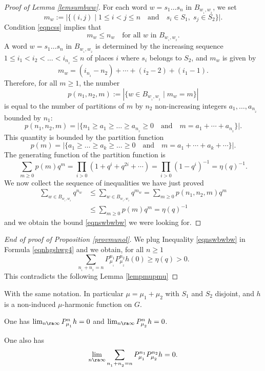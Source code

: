 \begin{proof}[Proof of Lemma \ref{lemsumbww}]
For each word $w=s_1\ldots s_n$ in $B_{w_{_1}\!,w_{_2}}$, we set
\[
m_w:=\bigl|\{(i,j)\mid 1\leq i< j\leq n
\quad\text{and}\quad s_i\in S_1,\; s_j\in S_2\}\bigr|.
\]
Condition \eqref{eqncss} implies that
\[
m_w \leq n_w
\quad\text{for all $w$ in $B_{w_{_1}\!,w_{_2}}$}.
\]
A word $w=s_1\ldots s_n$ in $B_{w_{_1}\!,w_{_2}}$ is determined by the
increasing sequence $1\leq i_1<i_2<\ldots <i_{n_{_2}}\leq n$ of places $i$
where $s_i$ belongs to $S_2$, and $m_w$ is given by
\[
m_w=(i_{n_{_2}}\!-\!n_2)+\cdots +(i_2\!-\! 2)+(i_1\!-\! 1).
\]
Therefore, for all $m\geq 1$,
the number
\[
p(n_1,n_2,m):=|\{w \in B_{w_{_1},w_{_2}}\mid
m_w=m\}|
\]
is equal to the number of partitions of $m$
by $n_2$ non-increasing integers $a_1,\ldots,a_{n_{_2}}$ bounded by $n_1$:
\[
p(n_1,n_2,m)=\bigl|\{n_1\geq a_1\geq \ldots \geq a_{n_{_2}}\geq 0
\quad\text{and}\quad m=a_1+\cdots+a_{n_{_2}}\}\bigl|.
\]
This quantity is bounded by the partition function
\[
p(m)=\bigl|\{a_1\geq \ldots \geq a_k\geq \ldots\geq 0
\quad\text{and}\quad m=a_1+\cdots+a_k+\cdots\}\bigl|.
\]
The generating function of the partition function is
\[
\label{eqnspmqmp}
\sum_{m\geq 0}p(m)q^m
=
\prod\limits_{i> 0}(1+q^i+q^{2i}+\cdots)
= \prod\limits_{i> 0}(1-q^i)^{-1}
= \eta(q)^{-1}.
\]
We now collect the sequence of inequalities
we have just proved
\begin{align*}
\sum_{w\in B_{w_{_1}\!,w_{_2}}} q^{n_w}
&\leq
\sum_{w\in B_{w_{_1}\!,w_{_2}}} q^{m_w}
=
\sum_{m\geq 0} p(n_1,n_2,m)q^{m}\\
&\leq
\sum_{m\geq 0} p(m)q^{m}
=
\eta(q)^{-1}
\end{align*}
and we obtain the bound \eqref{eqnswbwbw} we were looking for.
\end{proof}

\begin{proof}[End of proof of Proposition \ref{provmunol}]
We plug Inequality \eqref{eqnswbwbw} in Formula \eqref{eqnhgshwg4}
and we obtain, for all $n\geq 1$
\begin{equation}
\label{eqnpmupmu}
\sum_{n_{_1}+n_{_2}=n}
P^{n_1}_{\mu_{_1}}P^{n_2}_{\mu_{_2}}h(0)\geq \eta(q)>0.
\end{equation}
This contradicts the following Lemma \ref{lempmupmu}
\end{proof}

\begin{Lem}\label{lempmupmu}
With the same notation. In particular $\mu=\mu_1+\mu_2$
with $S_1$ and $S_2$ disjoint,
and $h$ is a non-induced $\mu$-harmonic function on $G$.
\begin{enumeratea}
\item\label{lempmupmua}
One has
$\lim_{n\ra\infty}P^{n}_{\mu_{_1}}h =0$ and $\lim_{n\ra\infty}P^{n}_{\mu_{_2}}h = 0$.
\item\label{lempmupmub}
One also has
\begin{equation}
\label{eqnpmupmo}
\lim_{n\ra\infty}\sum_{n_{_1}+n_{_2}=n}
P^{n_1}_{\mu_{_1}}P^{n_2}_{\mu_{_2}}h=0.
\end{equation}
\end{enumeratea}
\end{Lem}


